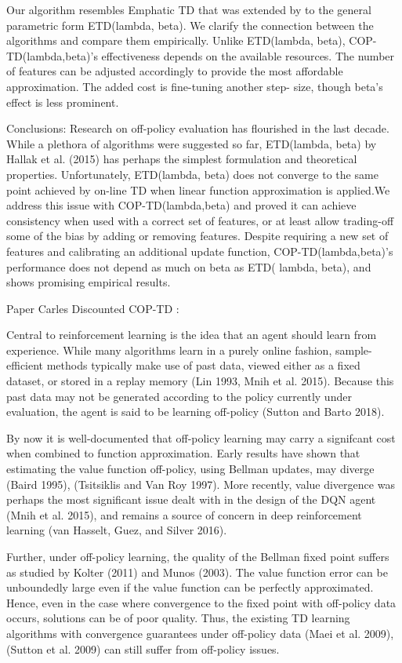 \documentclass[12pt,a4paper,openright,twoside]{article}
\numberwithin{equation}{section}
\theoremstyle{definition}
\theoremstyle{remark}
\theoremstyle{plain}
\begin{document}
Our algorithm resembles \cite{ETD} Emphatic TD that was extended by \cite{generalizedETD} to the general parametric form ETD(lambda, beta). We clarify the connection between the algorithms and compare them empirically. Unlike ETD(lambda, beta), COP-TD(lambda,beta)’s effectiveness depends on the available resources. The number of features can be adjusted accordingly to provide the most affordable approximation. The added cost is fine-tuning another step- size, though beta’s effect is less prominent.


Conclusions: Research on off-policy evaluation has flourished in the last decade. While a plethora of algorithms were suggested so far, ETD(lambda, beta) by Hallak et al. (2015) has perhaps the simplest formulation and theoretical properties. Unfortunately, ETD(lambda, beta) does not converge to the same point achieved by on-line TD when linear function approximation is applied.We address this issue with COP-TD(lambda,beta) and proved it can achieve consistency when used with a correct set of features, or at least allow trading-off some of the bias by adding or removing features. Despite requiring a new set of features and calibrating an additional update function, COP-TD(lambda,beta)’s performance does not depend as much on beta as ETD( lambda, beta), and shows promising empirical results.

Paper Carles Discounted COP-TD \cite{DCOPTD}:

Central to reinforcement learning is the idea that an agent should learn from experience. While many algorithms learn in a purely online fashion, sample-efficient methods typically make use of past data, viewed either as a fixed dataset, or stored in a replay memory (Lin 1993, Mnih et al. 2015). Because this past data may not be generated according to the policy currently under evaluation, the agent is said to be learning off-policy (Sutton and Barto 2018).

By now it is well-documented that off-policy learning may carry a signifcant cost when combined to function approximation. Early results have shown that estimating the value function off-policy, using Bellman updates, may diverge (Baird 1995), (Tsitsiklis and Van Roy 1997). More recently, value divergence was perhaps the most significant issue dealt with in the design of the DQN agent (Mnih et al. 2015), and remains a source of concern in deep reinforcement learning (van Hasselt, Guez, and Silver 2016).

Further, under off-policy learning, the quality of the Bellman fixed point suffers as studied by Kolter (2011) and Munos (2003). The value function error can be unboundedly large even if the value function can be perfectly approximated. Hence, even in the case where convergence to the fixed point with off-policy data occurs, solutions can be of poor quality. Thus, the existing TD learning algorithms with convergence guarantees under off-policy data (Maei et al. 2009), (Sutton et al. 2009) can still suffer from off-policy issues.
\end{document}
